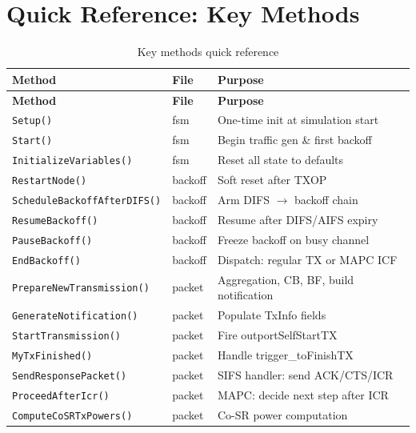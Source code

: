 \documentclass[11pt,a4paper]{article}
\begin{document}
\section{Quick Reference: Key Methods}
\label{sec:reference}

\begin{longtable}{p{5.5cm} p{2.5cm} p{6cm}}
\caption{Key methods quick reference}\label{tab:methods}\\
\toprule
\textbf{Method} & \textbf{File} & \textbf{Purpose} \\
\midrule
\endfirsthead
\toprule
\textbf{Method} & \textbf{File} & \textbf{Purpose} \\
\midrule
\endhead
\bottomrule
\endlastfoot
\texttt{Setup()}                   & fsm       & One-time init at simulation start \\
\texttt{Start()}                   & fsm       & Begin traffic gen \& first backoff \\
\texttt{InitializeVariables()}     & fsm       & Reset all state to defaults \\
\texttt{RestartNode()}             & backoff   & Soft reset after TXOP \\
\texttt{ScheduleBackoffAfterDIFS()} & backoff & Arm DIFS $\to$ backoff chain \\
\texttt{ResumeBackoff()}           & backoff   & Resume after DIFS/AIFS expiry \\
\texttt{PauseBackoff()}            & backoff   & Freeze backoff on busy channel \\
\texttt{EndBackoff()}              & backoff   & Dispatch: regular TX or MAPC ICF \\
\texttt{PrepareNewTransmission()}  & packet    & Aggregation, CB, BF, build notification \\
\texttt{GenerateNotification()}    & packet    & Populate TxInfo fields \\
\texttt{StartTransmission()}       & packet    & Fire outportSelfStartTX \\
\texttt{MyTxFinished()}            & packet    & Handle trigger\_toFinishTX \\
\texttt{SendResponsePacket()}      & packet    & SIFS handler: send ACK/CTS/ICR \\
\texttt{ProceedAfterIcr()}         & packet    & MAPC: decide next step after ICR \\
\texttt{ComputeCoSRTxPowers()}     & packet    & Co-SR power computation \\

\end{longtable}
\end{document}
